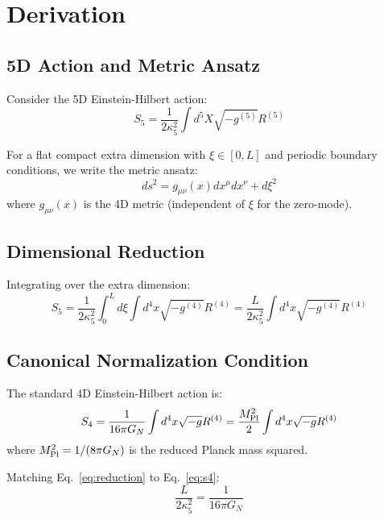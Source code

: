 \documentclass[11pt,a4paper]{article}
\begin{document}
\section{Derivation}

\subsection{5D Action and Metric Ansatz}

Consider the 5D Einstein-Hilbert action:
\begin{equation}
S_5 = \frac{1}{2\kappa_5^2} \int d^5X \sqrt{-g^{(5)}} R^{(5)}
\label{eq:s5}
\end{equation}

For a flat compact extra dimension with $\xi \in [0, L]$ and periodic
boundary conditions, we write the metric ansatz:
\begin{equation}
ds^2 = g_{\mu\nu}(x) dx^\mu dx^\nu + d\xi^2
\label{eq:metric}
\end{equation}
where $g_{\mu\nu}(x)$ is the 4D metric (independent of $\xi$ for the
zero-mode).

\subsection{Dimensional Reduction}

Integrating over the extra dimension:
\begin{equation}
S_5 = \frac{1}{2\kappa_5^2} \int_0^L d\xi \int d^4x \sqrt{-g^{(4)}} R^{(4)}
= \frac{L}{2\kappa_5^2} \int d^4x \sqrt{-g^{(4)}} R^{(4)}
\label{eq:reduction}
\end{equation}

\subsection{Canonical Normalization Condition}

The standard 4D Einstein-Hilbert action is:
\begin{equation}
S_4 = \frac{1}{16\pi G_N} \int d^4x \sqrt{-g} R^{(4)}
= \frac{M_{\rm Pl}^2}{2} \int d^4x \sqrt{-g} R^{(4)}
\label{eq:s4}
\end{equation}
where $M_{\rm Pl}^2 = 1/(8\pi G_N)$ is the reduced Planck mass squared.

Matching Eq.~\eqref{eq:reduction} to Eq.~\eqref{eq:s4}:
\begin{equation}
\frac{L}{2\kappa_5^2} = \frac{1}{16\pi G_N}
\label{eq:match}
\end{equation}
\end{document}
